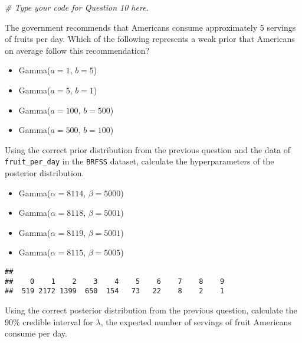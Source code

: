 \documentclass[
]{article}
\newenvironment{Shaded}{\begin{snugshade}}{\end{snugshade}}
\newcommand{\CommentTok}[1]{\textcolor[rgb]{0.56,0.35,0.01}{\textit{#1}}}
\newcommand{\KeywordTok}[1]{\textcolor[rgb]{0.13,0.29,0.53}{\textbf{#1}}}
\newcommand{\NormalTok}[1]{#1}
\newcommand{\OperatorTok}[1]{\textcolor[rgb]{0.81,0.36,0.00}{\textbf{#1}}}
\providecommand{\tightlist}{%
  \setlength{\itemsep}{0pt}\setlength{\parskip}{0pt}}
\begin{document}
\begin{Shaded}
\begin{Highlighting}[]
\CommentTok{# Type your code for Question 10 here.}
\end{Highlighting}
\end{Shaded}

The government recommends that Americans consume approximately 5
servings of fruits per day. Which of the following represents a weak
prior that Americans on average follow this recommendation?

\begin{itemize}
\tightlist
\item
  Gamma(\(a = 1\), \(b = 5\))
\item
  Gamma(\(a = 5\), \(b = 1\))
\item
  Gamma(\(a = 100\), \(b = 500\))
\item
  Gamma(\(a = 500\), \(b = 100\))
\end{itemize}

Using the correct prior distribution from the previous question and the
data of \texttt{fruit\_per\_day} in the \texttt{BRFSS} dataset,
calculate the hyperparameters of the posterior distribution.

\begin{itemize}
\tightlist
\item
  Gamma(\(\alpha = 8114\), \(\beta = 5000\))
\item
  Gamma(\(\alpha = 8118\), \(\beta = 5001\))
\item
  Gamma(\(\alpha = 8119\), \(\beta = 5001\))
\item
  Gamma(\(\alpha = 8115\), \(\beta = 5005\))
\end{itemize}

\begin{Shaded}
\end{Shaded}

\begin{verbatim}
## 
##    0    1    2    3    4    5    6    7    8    9 
##  519 2172 1399  650  154   73   22    8    2    1
\end{verbatim}

Using the correct posterior distribution from the previous question,
calculate the 90\% credible interval for \(\lambda\), the expected
number of servings of fruit Americans consume per day.
\end{document}
